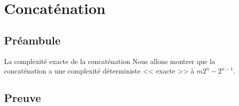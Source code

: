 
\section{Concaténation}


\subsection{Préambule}

\begin{frame}{\myframetitle}
  \begin{block}{La complexité exacte de la concaténation}
    Nous allons montrer que la concaténation a une complexité déterministe
    << exacte >> à \(m 2^n - 2^{n - 1}\).
  \end{block}
\end{frame}

\subsection{Preuve}

